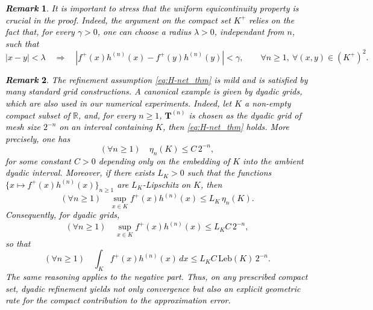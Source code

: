 \documentclass[review]{elsarticle}
\newcommand{\cblue}{\textcolor{black}}
\newtheorem{remark}{\em Remark}
\begin{document}
\cblue{
\begin{remark}
It is important to stress that the uniform equicontinuity property is crucial in the proof. Indeed, the argument on the compact set $K^+$ relies on the fact that, for every $\gamma>0$, one can choose a radius $\lambda>0$, \emph{independant from $n$}, such that
\begin{equation*}
|x-y|<\lambda
\quad\Longrightarrow\quad
|f^+(x)h^{(n)}(x)-f^+(y)h^{(n)}(y)|<\gamma,
\qquad \forall n\ge 1,\ \forall (x,y)\in (K^+)^2.
\end{equation*}
\end{remark}
%
\begin{remark}
\label{rk:dyadic}
The refinement assumption \eqref{eq:H-net_thm} is mild and is satisfied by many standard grid constructions. A canonical example is given by dyadic grids, which are also used in our numerical experiments. Indeed, let $K$ a non-empty compact subset of $\mathbb R$, and, for every $n\geq1$, $\mathbf T^{(n)}$ is chosen as the dyadic grid of mesh size $2^{-n}$ on an interval containing $K$, then \eqref{eq:H-net_thm} holds. More precisely, one has
\begin{equation}
(\forall n \geq 1) \quad \eta_n(K)\le C\,2^{-n},
\end{equation}
for some constant $C>0$ depending only on the embedding of $K$ into the ambient dyadic interval.
Moreover, 
if there exists $L_K>0$ such that the functions $\{x\mapsto f^+(x)h^{(n)}(x)\}_{n\ge1}$ are $L_K$-Lipschitz on $K$, then
\begin{equation}
(\forall n \geq 1) \quad \sup_{x\in K} f^+(x)h^{(n)}(x)\le L_K\,\eta_n(K).
\end{equation}
Consequently, for dyadic grids,
\begin{equation}
(\forall n \geq 1) \quad \sup_{x\in K} f^+(x)h^{(n)}(x)\le L_K C\,2^{-n},
\end{equation}
so that
\begin{equation}
(\forall n \geq 1) \quad \int_K f^+(x)h^{(n)}(x)\,dx \le L_K C\,\mathrm{Leb}(K)\,2^{-n}.
\end{equation}
The same reasoning applies to the negative part. Thus, on any prescribed compact set, dyadic refinement yields not only convergence but also an explicit geometric rate for the compact contribution to the approximation error.
\end{remark}
}
\end{document}

